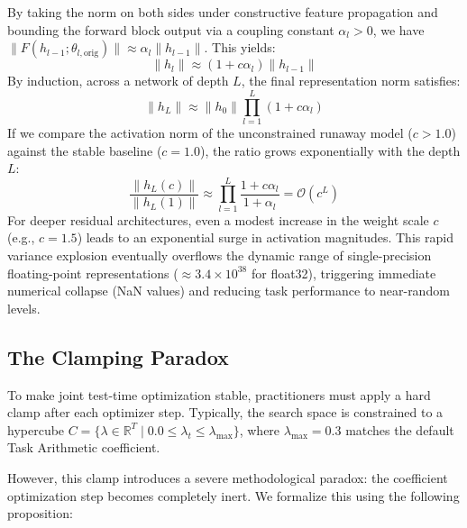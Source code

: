 \documentclass{article}
\theoremstyle{plain}
\theoremstyle{definition}
\theoremstyle{remark}
\begin{document}
By taking the norm on both sides under constructive feature propagation and bounding the forward block output via a coupling constant $\alpha_l > 0$, we have $\|F(h_{l-1}; \theta_{l, \text{orig}})\| \approx \alpha_l \|h_{l-1}\|$. This yields:
\begin{equation}
  \|h_l\| \approx (1 + c \alpha_l) \|h_{l-1}\|
\end{equation}
By induction, across a network of depth $L$, the final representation norm satisfies:
\begin{equation}
  \|h_L\| \approx \|h_0\| \prod_{l=1}^L (1 + c \alpha_l)
\end{equation}
If we compare the activation norm of the unconstrained runaway model ($c > 1.0$) against the stable baseline ($c = 1.0$), the ratio grows exponentially with the depth $L$:
\begin{equation}
  \frac{\|h_L(c)\|}{\|h_L(1)\|} \approx \prod_{l=1}^L \frac{1 + c \alpha_l}{1 + \alpha_l} = \mathcal{O}\left( c^L \right)
\end{equation}
For deeper residual architectures, even a modest increase in the weight scale $c$ (e.g., $c = 1.5$) leads to an exponential surge in activation magnitudes. This rapid variance explosion eventually overflows the dynamic range of single-precision floating-point representations ($\approx 3.4 \times 10^{38}$ for float32), triggering immediate numerical collapse (NaN values) and reducing task performance to near-random levels.

\subsection{The Clamping Paradox}
To make joint test-time optimization stable, practitioners must apply a hard clamp after each optimizer step. Typically, the search space is constrained to a hypercube $C = \{\lambda \in \mathbb{R}^T \mid 0.0 \le \lambda_t \le \lambda_{\text{max}}\}$, where $\lambda_{\text{max}} = 0.3$ matches the default Task Arithmetic coefficient.

However, this clamp introduces a severe methodological paradox: the coefficient optimization step becomes completely inert. We formalize this using the following proposition:
\end{document}
